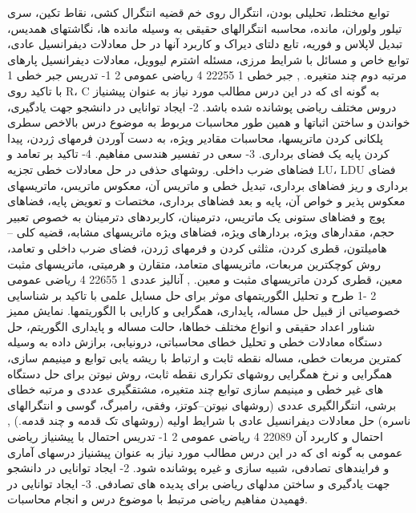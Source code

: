 \documentclass[class=article, crop=false]{standalone}
\begin{document}
{{{{        }}{{
            توابع مختلط، تحلیلی بودن، انتگرال روی خم قضیه انتگرال کشی، نقاط تکین، سری تیلور ولوران، مانده، محاسبه انتگرالهای حقیقی به وسیله مانده ها، نگاشتهای همدیس، تبدیل لاپلاس و فوریه، تابع دلتای دیراک و کاربرد آنها در حل معادلات دیفرانسیل عادی، توابع خاص و مسائل با شرایط مرزی، مسئله اشترم لیوویل، معادلات دیفرانسیل پارهای مرتبه دوم چند متغیره.
        }}
        },{{
            جبر خطی 1
        }{
            22255
        }{
            4
        }{
            ریاضی عمومی 2
        }{{
            1- تدریس جبر خطی 1 با تاکید روی R، C به گونه ای که در این درس مطالب مورد نیاز به عنوان پیشنیاز دروس مختلف ریاضی پوشانده شده باشد. 2- ایجاد توانایی در دانشجو جهت یادگیری، خواندن و ساختن اثباتها و همین طور محاسبات مربوط به موضوع درس بالاخص سطری پلکانی کردن ماتریسها، محاسبات مقادیر ویژه، به دست آوردن فرمهای ژردن، پیدا کردن پایه یک فضای برداری. 3- سعی در تفسیر هندسی مفاهیم. 4- تاکید بر تعامد و فضاهای ضرب داخلی.
        }}{{
            روشهای حذفی در حل معادلات خطی تجزیه LU، LDU فضای برداری و ریز فضاهای برداری، تبدیل خطی و ماتریس آن، معکوس ماتریس، ماتریسهای معکوس پذیر و خواص آن، پایه و بعد فضاهای برداری، مختصات و تعویض پایه، فضاهای پوچ و فضاهای ستونی یک ماتریس، دترمینان، کاربردهای دترمینان به خصوص تعبیر حجم، مقدارهای ویژه، بردارهای ویژه، فضاهای ویژه ماتریسهای مشابه، قضیه کلی – هامیلتون، قطری کردن، مثلثی کردن و فرمهای ژردن، فضای ضرب داخلی و تعامد، روش کوچکترین مربعات، ماتریسهای متعامد، متقارن و هرمیتی، ماتریسهای مثبت معین، قطری کردن ماتریسهای مثبت و معین.
        }}
        },{{
            آنالیز عددی 1
        }{
            22655
        }{
            4
        }{
            ریاضی عمومی 2
        }{{
            -1 طرح و تحلیل الگوریتمهای موثر برای حل مسایل علمی با تاکید بر شناسایی خصوصیاتی از قبیل حل مساله، پایداری، همگرایی و کارایی با الگوریتمها.
        }}{{
            نمایش ممیز شناور اعداد حقیقی و انواع مختلف خطاها، حالت مساله و پایداری الگوریتم، حل دستگاه معادلات خطی و تحلیل خطای محاسباتی، درونیابی، برازش داده به وسیله کمترین مربعات خطی، مساله نقطه ثابت و ارتباط با ریشه یابی توابع و مینیمم سازی، همگرایی و نرخ همگرایی روشهای تکراری نقطه ثابت، روش نیوتن برای حل دستگاه های غیر خطی و مینیمم سازی توابع چند متغیره، مشتقگیری عددی و مرتبه خطای برشی، انتگرالگیری عددی (روشهای نیوتن–کوتز، وفقی، رامبرگ، گوسی و انتگرالهای ناسره) حل معادلات دیفرانسیل عادی با شرایط اولیه (روشهای تک قدمه و چند قدمه.)
        }}
        },{{
            احتمال و کاربرد آن
        }{
            22089
        }{
            4
        }{
            ریاضی عمومی 2
        }{{
            1- تدریس احتمال با پیشنیاز ریاضی عمومی به گونه ای که در این درس مطالب مورد نیاز به عنوان پیشنیاز درسهای آماری و فرایندهای تصادفی، شبیه سازی و غیره پوشانده شود. 2- ایجاد توانایی در دانشجو جهت یادگیری و ساختن مدلهای ریاضی برای پدیده های تصادفی. 3- ایجاد توانایی در فهمیدن مفاهیم ریاضی مرتبط با موضوع درس و انجام محاسبات.
}}}}
\end{document}

